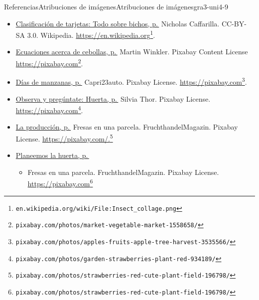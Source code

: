\begin{references-section}{Referencias}{Atribuciones de imágenes}{}{Atribuciones de imágenes}{}{}{gra3-uni4-9}
\begin{itemize}[label=\textbullet]
\begin{itemize}[label=$\circ$]
\end{itemize}
\item{}\hyperref[act-clasificacionDeTarjetas-todoSobreBichos]{Clasificación de tarjetas: Todo sobre bichos, p.\,\pageref{act-clasificacionDeTarjetas-todoSobreBichos}} Nicholas Caffarilla. CC-BY-SA 3.0. Wikipedia. \href{https://en.wikipedia.org/wiki/File:Insect_collage.png}{https:\slash{}\slash{}en.wikipedia.org}\footnote{\nolinkurl{en.wikipedia.org/wiki/File:Insect_collage.png}\label{gra3-uni4-9-2-4-3}}.%
\item{}\hyperref[act-ecuacionesCebollas]{Ecuaciones acerca de cebollas, p.\,\pageref{act-ecuacionesCebollas}} Martin Winkler. Pixabay Content License \href{https://pixabay.com/photos/market-vegetable-market-1558658/}{https:\slash{}\slash{}pixabay.com}\footnote{\nolinkurl{pixabay.com/photos/market-vegetable-market-1558658/}\label{gra3-uni4-9-2-5-3}}.%
\item{}\hyperref[act-diasDeManzanas]{Días de manzanas, p.\,\pageref{act-diasDeManzanas}} Capri23auto. Pixabay License. \href{https://pixabay.com/photos/apples-fruits-apple-tree-harvest-3535566/}{https:\slash{}\slash{}pixabay.com}\footnote{\nolinkurl{pixabay.com/photos/apples-fruits-apple-tree-harvest-3535566/}\label{gra3-uni4-9-2-6-3}}.%
\item{}\hyperref[warm-observa-huerta]{Observa y pregúntate: Huerta, p.\,\pageref{warm-observa-huerta}} Silvia Thor. Pixabay License. \href{https://pixabay.com/photos/garden-strawberries-plant-red-934189/}{https:\slash{}\slash{}pixabay.com}\footnote{\nolinkurl{pixabay.com/photos/garden-strawberries-plant-red-934189/}\label{gra3-uni4-9-2-7-3}}.%
\item{}\hyperref[act-produccionFresas]{La producción, p.\,\pageref{act-produccionFresas}} Fresas en una parcela. Fruchthandel\textunderscore{}Magazin. Pixabay License. \href{https://pixabay.com/photos/strawberries-red-cute-plant-field-196798/}{https:\slash{}\slash{}pixabay.com\slash{}.}\footnote{\nolinkurl{pixabay.com/photos/strawberries-red-cute-plant-field-196798/}\label{gra3-uni4-9-2-8-3}}%
\item{}\hyperref[act-planeemosLaHuerta]{Planeemos la huerta, p.\,\pageref{act-planeemosLaHuerta}}%
%
\begin{itemize}[label=$\circ$]
\item{}Fresas en una parcela. Fruchthandel\textunderscore{}Magazin. Pixabay License. \href{https://pixabay.com/photos/strawberries-red-cute-plant-field-196798/}{https:\slash{}\slash{}pixabay.com}\footnote{\nolinkurl{pixabay.com/photos/strawberries-red-cute-plant-field-196798/}\label{gra3-uni4-9-2-9-2-1-1-2}}%

\end{itemize}
\end{itemize}
\end{references-section}
